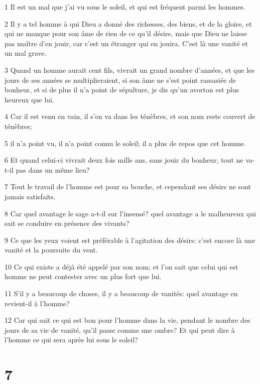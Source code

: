 \par 1 Il est un mal que j'ai vu sous le soleil, et qui est fréquent parmi les hommes.
\par 2 Il y a tel homme à qui Dieu a donné des richesses, des biens, et de la gloire, et qui ne manque pour son âme de rien de ce qu'il désire, mais que Dieu ne laisse pas maître d'en jouir, car c'est un étranger qui en jouira. C'est là une vanité et un mal grave.
\par 3 Quand un homme aurait cent fils, vivrait un grand nombre d'années, et que les jours de ses années se multiplieraient, si son âme ne s'est point rassasiée de bonheur, et si de plus il n'a point de sépulture, je dis qu'un avorton est plus heureux que lui.
\par 4 Car il est venu en vain, il s'en va dans les ténèbres, et son nom reste couvert de ténèbres;
\par 5 il n'a point vu, il n'a point connu le soleil; il a plus de repos que cet homme.
\par 6 Et quand celui-ci vivrait deux fois mille ans, sans jouir du bonheur, tout ne va-t-il pas dans un même lieu?
\par 7 Tout le travail de l'homme est pour sa bouche, et cependant ses désirs ne sont jamais satisfaits.
\par 8 Car quel avantage le sage a-t-il sur l'insensé? quel avantage a le malheureux qui sait se conduire en présence des vivants?
\par 9 Ce que les yeux voient est préférable à l'agitation des désirs: c'est encore là une vanité et la poursuite du vent.
\par 10 Ce qui existe a déjà été appelé par son nom; et l'on sait que celui qui est homme ne peut contester avec un plus fort que lui.
\par 11 S'il y a beaucoup de choses, il y a beaucoup de vanités: quel avantage en revient-il à l'homme?
\par 12 Car qui sait ce qui est bon pour l'homme dans la vie, pendant le nombre des jours de sa vie de vanité, qu'il passe comme une ombre? Et qui peut dire à l'homme ce qui sera après lui sous le soleil?

\chapter{7}

